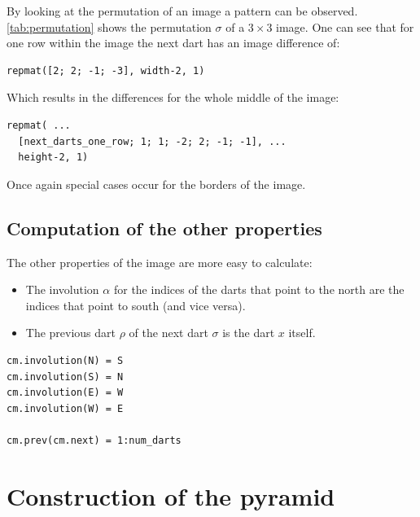 \documentclass[12pt]{article}
\begin{document}
By looking at the permutation of an image a pattern can be observed. \cref{tab:permutation} shows the permutation \( \sigma \) of a \( 3 \times 3 \) image. One can see that for one row within the image the next dart has an image difference of:
\begin{lstlisting}
repmat([2; 2; -1; -3], width-2, 1)
\end{lstlisting}
Which results in the differences for the whole middle of the image:

\begin{lstlisting}
repmat( ...
  [next_darts_one_row; 1; 1; -2; 2; -1; -1], ...
  height-2, 1)
\end{lstlisting}

Once again special cases occur for the borders of the image.


\subsection{Computation of the other properties} %
\label{sub:computation_of_the_other_properties}

The other properties of the image are more easy to calculate:

\begin{itemize}
  \item The involution \( \alpha \) for the indices of the darts that point to the north are the indices that point to south (and vice versa).
  \item The previous dart \( \rho \)  of the next dart \( \sigma \) is the dart \( x \) itself.
\end{itemize}

\begin{lstlisting}
cm.involution(N) = S
cm.involution(S) = N
cm.involution(E) = W
cm.involution(W) = E

cm.prev(cm.next) = 1:num_darts
\end{lstlisting}




\section{Construction of the pyramid} %
\label{sec:construction_of_the_pyramid}
\end{document}

